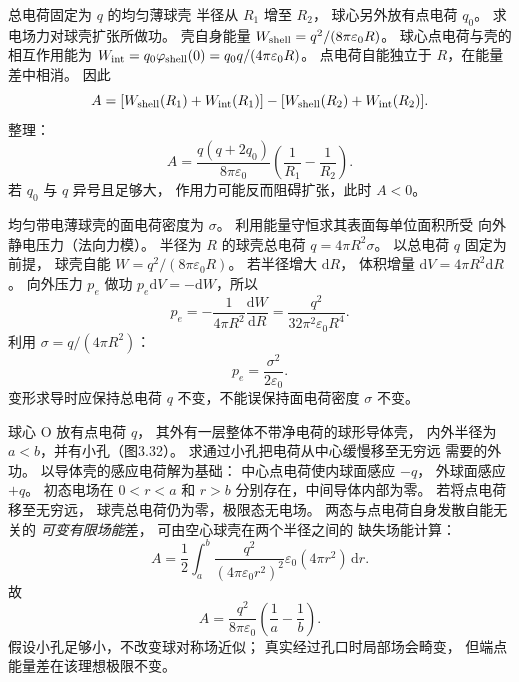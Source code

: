 总电荷固定为 $q$ 的均匀薄球壳
半径从 $R_1$ 增至 $R_2$，
球心另外放有点电荷 $q_0$。
求电场力对球壳扩张所做功。
\exsolution
壳自身能量
$W_{\rm shell}=q^2/(8\pi\varepsilon_0R)$。
球心点电荷与壳的相互作用能为
$W_{\rm int}=q_0\varphi_{\rm shell}(0)
=q_0q/(4\pi\varepsilon_0R)$。
点电荷自能独立于 $R$，在能量差中相消。
因此
\[
A=[W_{\rm shell}(R_1)+W_{\rm int}(R_1)]
-[W_{\rm shell}(R_2)+W_{\rm int}(R_2)].
\]
整理：
\[
\boxed{A=
\frac{q(q+2q_0)}{8\pi\varepsilon_0}
\left(\frac1{R_1}-\frac1{R_2}\right)}.
\]
\excheck 若 $q_0$ 与 $q$ 异号且足够大，
作用力可能反而阻碍扩张，此时 $A<0$。

均匀带电薄球壳的面电荷密度为 $\sigma$。
利用能量守恒求其表面每单位面积所受
向外静电压力（法向力模）。
\exsolution
半径为 $R$ 的球壳总电荷
$q=4\pi R^2\sigma$。
以总电荷 $q$ 固定为前提，
球壳自能
$W=q^2/(8\pi\varepsilon_0R)$。
若半径增大 $\mathrm dR$，
体积增量
$\mathrm dV=4\pi R^2\mathrm dR$。
向外压力 $p_e$ 做功
$p_e\mathrm dV=-\mathrm dW$，所以
\[
p_e=-\frac1{4\pi R^2}\frac{\mathrm dW}{\mathrm dR}
=\frac{q^2}{32\pi^2\varepsilon_0R^4}.
\]
利用
$\sigma=q/(4\pi R^2)$：
\[
\boxed{p_e=\frac{\sigma^2}{2\varepsilon_0}}.
\]
\excheck 变形求导时应保持总电荷 $q$
不变，不能误保持面电荷密度 $\sigma$ 不变。

球心 O 放有点电荷 $q$，
其外有一层整体不带净电荷的球形导体壳，
内外半径为 $a<b$，并有小孔（图3.32）。
求通过小孔把电荷从中心缓慢移至无穷远
需要的外功。
\exsolution
以导体壳的感应电荷解为基础：
中心点电荷使内球面感应 $-q$，
外球面感应 $+q$。
初态电场在 $0<r<a$ 和 $r>b$
分别存在，中间导体内部为零。
若将点电荷移至无穷远，
球壳总电荷仍为零，极限态无电场。
两态与点电荷自身发散自能无关的
\emph{可变有限场能}差，
可由空心球壳在两个半径之间的
缺失场能计算：
\[
A=\frac12\int_a^b
\frac{q^2}{(4\pi\varepsilon_0r^2)^2}
\varepsilon_0(4\pi r^2)\,\mathrm dr.
\]
故
\[
\boxed{A=\frac{q^2}{8\pi\varepsilon_0}
\left(\frac1a-\frac1b\right)}.
\]
\excheck 假设小孔足够小，不改变球对称场近似；
真实经过孔口时局部场会畸变，
但端点能量差在该理想极限不变。
